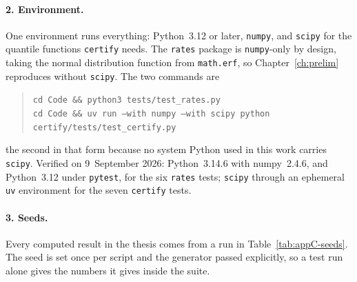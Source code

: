 \documentclass[../../main.tex]{subfiles}
\begin{document}
\paragraph{2. Environment.} One environment runs everything: Python~3.12 or later, \texttt{numpy}, and \texttt{scipy} for the quantile functions \texttt{certify} needs. The \texttt{rates} package is \texttt{numpy}-only by design, taking the normal distribution function from \texttt{math.erf}, so Chapter~\ref{ch:prelim} reproduces without \texttt{scipy}. The two commands are
\begin{quote}\small
\texttt{cd Code \&\& python3 tests/test\_rates.py}\\
\texttt{cd Code \&\& uv run --with numpy --with scipy python certify/tests/test\_certify.py}
\end{quote}
the second in that form because no system Python used in this work carries \texttt{scipy}. Verified on 9~September 2026: Python~3.14.6 with numpy~2.4.6, and Python~3.12 under \texttt{pytest}, for the six \texttt{rates} tests; \texttt{scipy} through an ephemeral \texttt{uv} environment for the seven \texttt{certify} tests.


\paragraph{3. Seeds.} Every computed result in the thesis comes from a run in Table~\ref{tab:appC-seeds}. The seed is set once per script and the generator passed explicitly, so a test run alone gives the numbers it gives inside the suite.
\end{document}
